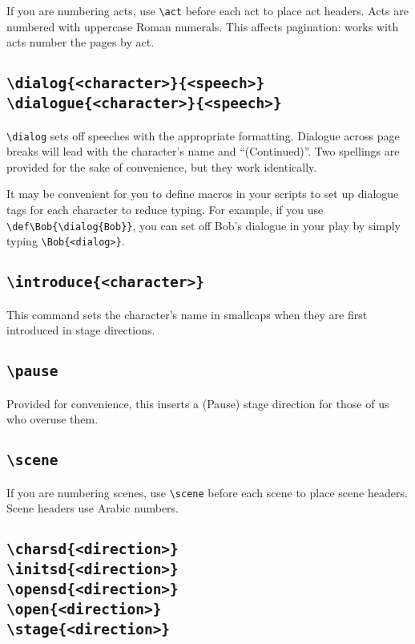 \documentclass{report}
\begin{document}
If you are numbering acts, use \verb|\act| before each act to place act headers. Acts are numbered with uppercase Roman numerals. This affects pagination: works with acts number the pages by act.

\cprotect\subsection[\verb|\dialog{<character>}{<speech>}| \verb|\dialogue{<character>}{<speech>}|]{\verb|\dialog{<character>}{<speech>}|\\\verb|\dialogue{<character>}{<speech>}|}

\verb|\dialog| sets off speeches with the appropriate formatting. Dialogue across page breaks will lead with the character’s name and “(Continued)”. Two spellings are provided for the sake of convenience, but they work identically.

It may be convenient for you to define macros in your scripts to set up dialogue tags for each character to reduce typing. For example, if you use \verb|\def\Bob{\dialog{Bob}}|, you can set off Bob’s dialogue in your play by simply typing \verb|\Bob{<dialog>}|.

\cprotect\subsection{\verb|\introduce{<character>}|}

This command sets the character’s name in smallcaps when they are first introduced in stage directions.

\cprotect\subsection{\verb|\pause|}

Provided for convenience, this inserts a (Pause) stage direction for those of us who overuse them.

\cprotect\subsection{\verb|\scene|}

If you are numbering scenes, use \verb|\scene| before each scene to place scene headers. Scene headers use Arabic numbers.

\cprotect\subsection[\verb|\charsd{<direction>}| \verb|\initsd{<direction>}| \verb|\opensd{<direction>}| \verb|\open{<direction>}| \verb|\stage{<direction>}|]{\verb|\charsd{<direction>}|\\\verb|\initsd{<direction>}|\\\verb|\opensd{<direction>}|\\\verb|\open{<direction>}|\\\verb|\stage{<direction>}|}
\end{document}
